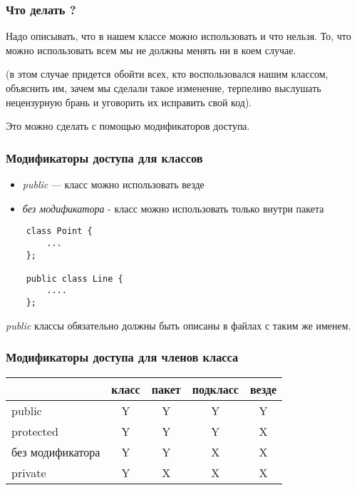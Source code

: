 \begin{frame}[fragile]
	\frametitle{Что делать ?}
	\begin{Large}
	Надо описывать, что в нашем классе можно использовать и что нельзя. То, что можно использовать всем мы не должны менять ни в коем случае.\end{Large}
	
	\begin{small} (в этом случае придется обойти всех, кто воспользовался нашим классом, объяснить им, зачем мы сделали такое изменение, терпеливо выслушать нецензурную брань и уговорить их исправить свой код).\end{small}

	\medskip
	\begin{Large}
	Это можно сделать с помощью модификаторов доступа.
	\end{Large}
\end{frame}

\begin{frame}[fragile]
	\frametitle{Модификаторы доступа для классов}

	\begin{Large}
	\begin{itemize}
	\item{\emph{public} --- класс можно использовать везде}
	\item{\emph{без модификатора} - класс можно использовать только внутри пакета}
	\end{itemize}
	\end{Large}

	\begin{verbatim}
	class Point {
	    ...
	};

	public class Line {
	    ....
	};
	\end{verbatim}

	\emph{public} классы обязательно должны быть описаны в файлах с таким же именем.
\end{frame}

\begin{frame}[fragile]
	\frametitle{Модификаторы доступа для членов класса}

	{\bf
	\begin{large}
	\begin{tabular}[b]{|l|c|c|c|c|}
	\hline
	&класс&пакет&подкласс&везде\\[2ex]
	\hline
	public&Y&Y&Y&Y\\[2ex]
	\hline
	protected&Y&Y&Y&X\\[2ex]
	\hline
	без модификатора&Y&Y&X&X\\[2ex]
	\hline
	private&Y&X&X&X\\[2ex]
	\hline
	\end{tabular}
	\end{large}
	}
\end{frame}

